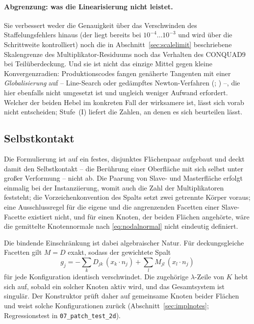 \documentclass[a4paper,11pt]{article}
\def\bm#1{#1}%
\def\tilde#1{#1}%
\newcommand{\file}[1]{\texttt{\small #1}}
\begin{document}
\paragraph{Abgrenzung: was die Linearisierung nicht leistet.}
Sie verbessert weder die Genauigkeit über das Verschwinden des Staffelungsfehlers hinaus (der
liegt bereits bei $10^{-4}\ldots10^{-3}$ und wird über die Schrittweite kontrolliert) noch die in
Abschnitt~\ref{sec:scalelimit} beschriebene Skalengrenze des Multiplikator-Residuums noch das
Verhalten des CONQUAD9 bei Teilüberdeckung. Und sie ist nicht das einzige Mittel gegen kleine
Konvergenzradien: Produktionscodes fangen genäherte Tangenten mit einer
\emph{Globalisierung} auf -- Line-Search oder gedämpftes Newton-Verfahren
(\citealp{deuflhard2004}; \citealp{deluca1996}) --, die hier ebenfalls nicht umgesetzt ist und
ungleich weniger Aufwand erfordert. Welcher der beiden Hebel im konkreten Fall der wirksamere
ist, lässt sich vorab nicht entscheiden; Stufe~(I) liefert die Zahlen, an denen es sich
beurteilen lässt.

\subsection{Selbstkontakt}
\label{sec:ausblick:selbst}

Die Formulierung ist auf ein festes, disjunktes Flächenpaar aufgebaut und deckt damit den
Selbstkontakt -- die Berührung einer Oberfläche mit sich selbst unter großer Verformung -- nicht ab.
Die Paarung von Slave- und Masterfläche erfolgt einmalig bei der Instanziierung, womit auch die
Zahl der Multiplikatoren feststeht; die Vorzeichenkonvention des Spalts setzt zwei getrennte Körper
voraus; eine Ausschlussregel für die eigene und die angrenzenden Facetten einer Slave-Facette
existiert nicht, und für einen Knoten, der beiden Flächen angehörte, wäre die gemittelte
Knotennormale nach \eqref{eq:nodalnormal} nicht eindeutig definiert.

Die bindende Einschränkung ist dabei algebraischer Natur. Für deckungsgleiche Facetten gilt
$\bm M=\bm D$ exakt, sodass der gewichtete Spalt
\begin{equation*}
\tilde g_j = -\sum_k D_{jk}\,(\bm x_k\!\cdot\!\bm n_j) + \sum_l M_{jl}\,(\bm x_l\!\cdot\!\bm n_j)
\end{equation*}
für jede Konfiguration identisch verschwindet. Die zugehörige $\lambda$-Zeile von $\bm K$ hebt sich
auf, sobald ein solcher Knoten aktiv wird, und das Gesamtsystem ist singulär. Der Konstruktor prüft
daher auf gemeinsame Knoten beider Flächen und weist solche Konfigurationen zurück
(Abschnitt~\ref{sec:implnotes}; Regressionstest in \file{07\_patch\_test\_2d}).
\end{document}
